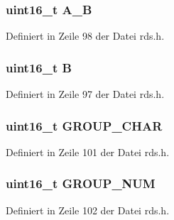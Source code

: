 \subsubsection[{A\+\_\+\+B}]{\setlength{\rightskip}{0pt plus 5cm}uint16\+\_\+t A\+\_\+\+B}\label{structgroup__2a_a226eb9a4ec1152d0c92ce7324916ad56}


Definiert in Zeile 98 der Datei rds.\+h.

\hypertarget{structgroup__2a_ae783bd90764c8455228772c025c064e4}{}
\subsubsection[{B}]{\setlength{\rightskip}{0pt plus 5cm}uint16\+\_\+t B}\label{structgroup__2a_ae783bd90764c8455228772c025c064e4}


Definiert in Zeile 97 der Datei rds.\+h.

\hypertarget{structgroup__2a_a66d4119990dc4c3e040a43885e9bb953}{}
\subsubsection[{G\+R\+O\+U\+P\+\_\+\+C\+H\+A\+R}]{\setlength{\rightskip}{0pt plus 5cm}uint16\+\_\+t G\+R\+O\+U\+P\+\_\+\+C\+H\+A\+R}\label{structgroup__2a_a66d4119990dc4c3e040a43885e9bb953}


Definiert in Zeile 101 der Datei rds.\+h.

\hypertarget{structgroup__2a_a9f692e9f76ee88348d426bcd4e9bc70b}{}
\subsubsection[{G\+R\+O\+U\+P\+\_\+\+N\+U\+M}]{\setlength{\rightskip}{0pt plus 5cm}uint16\+\_\+t G\+R\+O\+U\+P\+\_\+\+N\+U\+M}\label{structgroup__2a_a9f692e9f76ee88348d426bcd4e9bc70b}


Definiert in Zeile 102 der Datei rds.\+h.

\hypertarget{structgroup__2a_a5cd9b1f6413028425796c1129aa8fd87}{}
